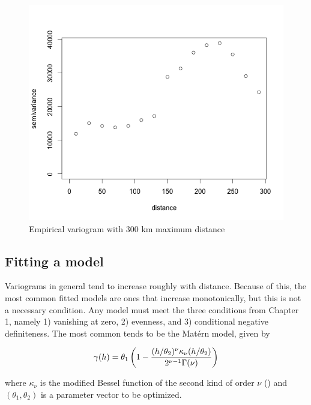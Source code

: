 \documentclass[12pt,twoside]{reedthesis}
\begin{document}
\begin{figure}[h!]
	   
	       \centering
	  
	    \includegraphics[scale=0.6]{Variogram}
	
	     \caption{Empirical variogram with 300 km maximum distance}
	 \label{variogram}
	\end{figure}

\subsection{Fitting a model}

Variograms in general tend to increase roughly with distance. Because of this, the most common fitted models are ones that increase monotonically, but this is not a necessary condition. Any model must meet the three conditions from Chapter 1, namely 1) vanishing at zero, 2) evenness, and 3) conditional negative definiteness. The most common tends to be the Mat\'ern model, given by 

\begin{align*}
\gamma(h) = \theta_1\left (1-{{(h/\theta_2)^\nu\kappa_{\nu}(h/\theta_2)}\over{2^{\nu-1}\Gamma(\nu)}} \right )
\end{align*}

where $\kappa_\nu$ is the modified Bessel function of the second kind of order $\nu$ (\cite{gelfand:2010}) and $(\theta_1, \theta_2)$ is a parameter vector to be optimized. \\
\end{document}

